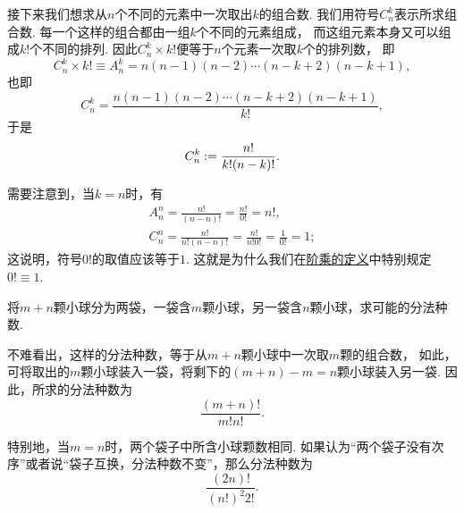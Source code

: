 接下来我们想求从\(n\)个不同的元素中一次取出\(k\)的组合数.
我们用符号\(C_n^k\)表示所求组合数.
每一个这样的组合都由一组\(k\)个不同的元素组成，
而这组元素本身又可以组成\(k!\)个不同的排列.
因此\(C_n^k \times k!\)便等于\(n\)个元素一次取\(k\)个的排列数，
即\begin{equation*}
	C_n^k \times k! \equiv A_n^k
	= n(n-1)(n-2)\dotsm(n-k+2)(n-k+1),
\end{equation*}
也即\begin{equation*}
	C_n^k = \frac{n(n-1)(n-2)\dotsm(n-k+2)(n-k+1)}{k!},
\end{equation*}
于是\begin{align}
	C_n^k := \frac{n!}{k! (n-k)!}.
\end{align}

需要注意到，当\(k=n\)时，有\begin{gather*}
	A_n^n = \frac{n!}{(n-n)!} = \frac{n!}{0!} = n!, \\
	C_n^n = \frac{n!}{n! (n-n)!} = \frac{n!}{n! 0!} = \frac{1}{0!} = 1;
\end{gather*}
这说明，符号\(0!\)的取值应该等于\(1\).
这就是为什么我们在\hyperref[definition:数列.阶乘的定义]{阶乘的定义}中特别规定\(0!\equiv1\).

\begin{example}
将\(m+n\)颗小球分为两袋，一袋含\(m\)颗小球，另一袋含\(n\)颗小球，求可能的分法种数.
\begin{solution}
不难看出，这样的分法种数，等于从\(m+n\)颗小球中一次取\(m\)颗的组合数，
如此，可将取出的\(m\)颗小球装入一袋，将剩下的\((m+n)-m=n\)颗小球装入另一袋.
因此，所求的分法种数为\begin{equation*}
	\frac{(m+n)!}{m! n!}.
\end{equation*}

特别地，当\(m=n\)时，两个袋子中所含小球颗数相同.
如果认为“两个袋子没有次序”或者说“袋子互换，分法种数不变”，那么分法种数为\begin{equation*}
	\frac{(2n)!}{(n!)^2 2!}.
\end{equation*}
\end{solution}
\end{example}

